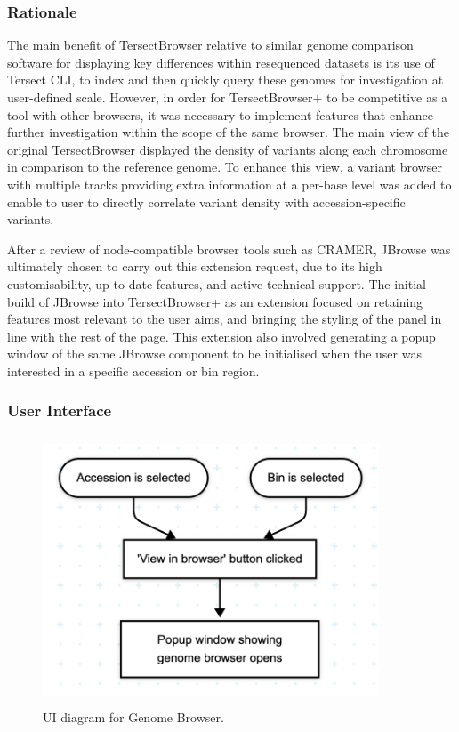 \documentclass[12pt]{article}
\begin{document}
\subsubsection{Rationale}
The main benefit of TersectBrowser relative to similar genome comparison software for displaying key differences within resequenced datasets is its use of Tersect CLI, to index and then quickly query these genomes for investigation at user-defined scale. However, in order for TersectBrowser+ to be competitive as a tool with other browsers, it was necessary to implement features that enhance further investigation within the scope of the same browser. The main view of the original TersectBrowser displayed the density of variants along each chromosome in comparison to the reference genome. To enhance this view, a variant browser with multiple tracks providing extra information at a per-base level was added to enable to user to directly correlate variant density with accession-specific variants. 

After a review of node-compatible browser tools such as CRAMER, JBrowse was ultimately chosen to carry out this extension request, due to its high customisability, up-to-date features, and active technical support. The initial build of JBrowse into TersectBrowser+ as an extension focused on retaining features most relevant to the user aims, and bringing the styling of the panel in line with the rest of the page. This extension also involved generating a popup window of the same JBrowse component to be initialised when the user was interested in a specific accession or bin region. 

\subsubsection{User Interface}
\begin{figure}[h]
    \centering
    \includegraphics[width=10cm, height=8cm]{GenomeBrowser.png}
    \caption{UI diagram for Genome Browser.}
\end{figure}
\end{document}
